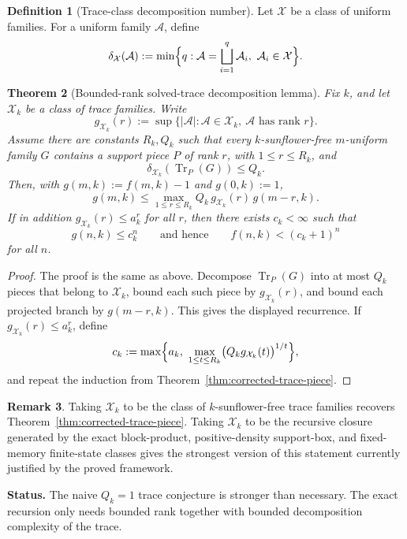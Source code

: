 \documentclass[11pt]{article}
\newtheorem{theorem}{Theorem}[section]
\theoremstyle{definition}
\newtheorem{definition}[theorem]{Definition}
\newtheorem{remark}[theorem]{Remark}
\newcommand{\Tr}{\operatorname{Tr}}
\newcommand{\1}{\mathbf{1}}
\newcommand{\status}[1]{\par\smallskip\noindent\textbf{Status.} #1\par\smallskip}
\begin{document}
\begin{definition}[Trace-class decomposition number]
Let $\mathcal X$ be a class of uniform families. For a uniform family $\mathcal A$, define
\[
\delta_{\mathcal X}(\mathcal A):=\min\Bigl\{q: \mathcal A=\bigsqcup_{i=1}^q \mathcal A_i,\ \mathcal A_i\in \mathcal X\Bigr\}.
\]
\end{definition}

\begin{theorem}[Bounded-rank solved-trace decomposition lemma]\label{thm:bounded-rank-solved-trace}
Fix $k$, and let $\mathcal X_k$ be a class of trace families. Write
\[
g_{\mathcal X_k}(r):=\sup\{ |\mathcal A| : \mathcal A\in \mathcal X_k,\ \mathcal A\text{ has rank }r\}.
\]
Assume there are constants $R_k,Q_k$ such that every $k$-sunflower-free $m$-uniform family $G$ contains a support piece $P$ of rank $r$, with $1\le r\le R_k$, and
\[
\delta_{\mathcal X_k}(\Tr_P(G))\le Q_k.
\]
Then, with $g(m,k):=f(m,k)-1$ and $g(0,k):=1$,
\[
g(m,k)\le \max_{1\le r\le R_k} Q_k\,g_{\mathcal X_k}(r)\,g(m-r,k).
\]
If in addition $g_{\mathcal X_k}(r)\le a_k^r$ for all $r$, then there exists $c_k<\infty$ such that
\[
g(n,k)\le c_k^n
\qquad\text{and hence}\qquad
f(n,k)<(c_k+1)^n
\]
for all $n$.
\end{theorem}

\begin{proof}
The proof is the same as above. Decompose $\Tr_P(G)$ into at most $Q_k$ pieces that belong to $\mathcal X_k$, bound each such piece by $g_{\mathcal X_k}(r)$, and bound each projected branch by $g(m-r,k)$. This gives the displayed recurrence. If $g_{\mathcal X_k}(r)\le a_k^r$, define
\[
c_k:=\max\Bigl\{a_k,\ \max_{1\le t\le R_k}\bigl(Q_k g_{\mathcal X_k}(t)\bigr)^{1/t}\Bigr\},
\]
and repeat the induction from Theorem~\ref{thm:corrected-trace-piece}.
\end{proof}

\begin{remark}
Taking $\mathcal X_k$ to be the class of $k$-sunflower-free trace families recovers Theorem~\ref{thm:corrected-trace-piece}. Taking $\mathcal X_k$ to be the recursive closure generated by the exact block-product, positive-density support-box, and fixed-memory finite-state classes gives the strongest version of this statement currently justified by the proved framework.
\end{remark}

\status{The naive $Q_k=1$ trace conjecture is stronger than necessary. The exact recursion only needs bounded rank together with bounded decomposition complexity of the trace.}
\end{document}
